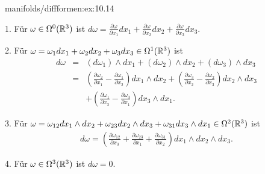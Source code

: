 \begin{example}{}{manifolds/diffformen:ex:10.14}



\par
1. Für \(\omega\in\Omega^0(\mathbb{R}^3)\) ist \(d\omega = \frac{\partial\omega}{\partial x_1}dx_1+
\frac{\partial\omega}{\partial x_2}dx_2+\frac{\partial\omega}{\partial x_3}dx_3\).



\par
2. Für \(\omega = \omega_1dx_1+\omega_2dx_2+\omega_3dx_3\in\Omega^1(\mathbb{R}^3)\) ist
\begin{align*}
d\omega &=& (d\omega_1)\wedge dx_1+(d\omega_2)\wedge dx_2+(d\omega_3)\wedge
dx_3\\
&=& \left(\frac{\partial\omega_2}{\partial x_1}-\frac{\partial\omega_1}{\partial x_2}\right)
dx_1\wedge dx_2+ \left(\frac{\partial\omega_3}{\partial x_2}-\frac{\partial\omega_2}{\partial x_3}\right)
dx_2\wedge dx_3\\
&& + \left(\frac{\partial\omega_1}{\partial x_3}-\frac{\partial\omega_3}{\partial x_1}\right)
dx_3\wedge dx_1.
\end{align*}


\par
3. Für \(\omega = \omega_{12}dx_1\wedge dx_2+\omega_{23}dx_2\wedge dx_3
+\omega_{31}dx_3\wedge dx_1 \in\Omega^2(\mathbb{R}^3)\) ist
\begin{align*}
d\omega = \left(\frac{\partial\omega_{12}}{\partial x_3} + \frac{\partial\omega_{23}}{\partial x_1}
+ \frac{\partial\omega_{31}}{\partial x_2}\right)dx_1\wedge dx_2\wedge dx_3.
\end{align*}


\par
4. Für \(\omega\in\Omega^3(\mathbb{R}^3)\) ist \(d\omega=0\).
\end{example}

